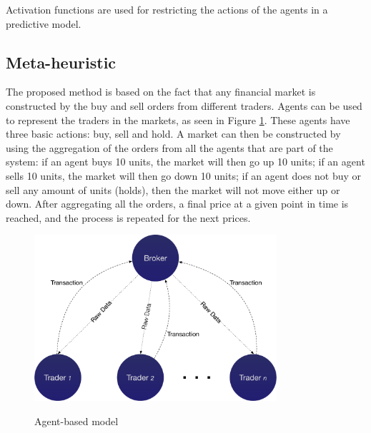\documentclass[review]{elsarticle}
\begin{document}
Activation functions are used for restricting the actions of the agents in a
predictive model. 








\subsection{Meta-heuristic}
\label{subsection:meta-heuristic}



The proposed method is based on the fact that any financial market is
constructed by the buy and sell orders from different traders. Agents can be
used to represent the traders in the markets, as seen in Figure
\ref{figure:agent-based-model}. These agents have three basic actions: buy, sell
and hold. A market can then be constructed by using the aggregation of the
orders from all the agents that are part of the system: if an agent buys 10
units, the market will then go up 10 units; if an agent sells 10 units, the
market will then go down 10 units; if an agent does not buy or sell any amount
of units (holds), then the market will not move either up or down. After
aggregating all the orders, a final price at a given point in time is reached,
and the process is repeated for the next prices.

\begin{figure}
\caption{Agent-based model}
\centering
\includegraphics[width=0.8\textwidth]{img/agent-model.pdf}
\label{figure:agent-based-model}
\end{figure}
\end{document}
